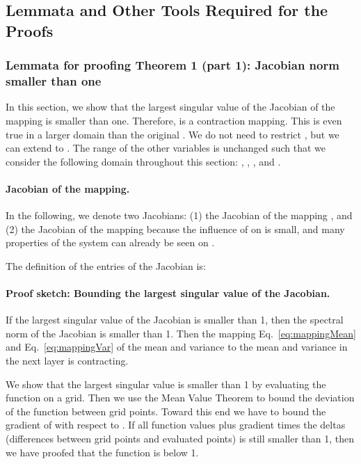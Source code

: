 \documentclass{article}
\begin{document}
\subsection{Lemmata and Other Tools Required for the Proofs} 

\subsubsection{Lemmata for proofing Theorem 1 (part 1): Jacobian norm smaller than one} 
\label{sec:S}
In this section, we show that the largest singular value of the Jacobian of the 
mapping  is smaller than one. Therefore,  is a contraction mapping. 
This is even true in a larger domain than the original . We 
do not need to restrict , but we can extend to
. The range of the other variables is unchanged such that 
we consider the following domain throughout this section: ,
,
, and
. 

\paragraph{Jacobian of the mapping.}
In the following, we denote two Jacobians: 
(1) the Jacobian  of the mapping  , and
(2) the Jacobian  of the mapping 
because the influence of  on  is small, 
and many properties of the system can already be seen on . 





The definition of the entries of the Jacobian  is: 


\paragraph{Proof sketch: Bounding the largest singular value of the Jacobian.}

If the largest singular value of the Jacobian is smaller than 1, then
the spectral norm of the Jacobian is smaller than 1.
Then the mapping  Eq.~\eqref{eq:mappingMean} 
and Eq.~\eqref{eq:mappingVar} 
of the mean and variance to the mean and variance in the next layer is contracting.



We show that the largest singular value is smaller than 1 by
evaluating the function
 on a grid.
Then we use the Mean Value Theorem to bound the deviation of the
function  between grid points. 
Toward this end we have to bound the gradient of  with respect to
. If all function values plus
gradient times the deltas (differences between grid points and evaluated
points) is still smaller than 1, then we have proofed that the
function is below 1. 
\end{document}
